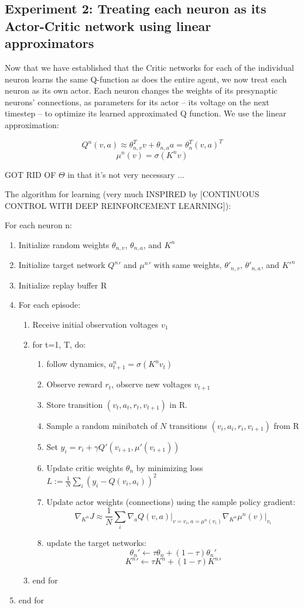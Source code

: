 \subsection{Experiment 2: Treating each neuron as its Actor-Critic network using linear approximators}

Now that we have established that the Critic networks for each of the individual neuron learns the same Q-function as does the entire agent, we now treat each neuron as its own actor. Each neuron changes the weights of its presynaptic neurons' connections, as parameters for its actor -- its voltage on the next timestep -- to optimize its learned approximated Q function. We use the linear approximation:

$$Q^{n}(v, a) \approx \theta_{n,v}^T v + \theta_{n,a}a = \theta_{n}^T (v, a)^T$$
$$\mu^{n}(v) = \sigma(K^n v)$$

GOT RID OF $\Theta$ in that it's not very necessary ...

The algorithm for learning (very much INSPIRED by [CONTINUOUS CONTROL WITH DEEP REINFORCEMENT
LEARNING]):

For each neuron n:
\begin{enumerate}
\item[] Initialize random weights $\theta_{n,v}$, $\theta_{n,a}$, and $K^n$
\item[] Initialize target network $Q^n'$ and $\mu^n'$ with same weights, $\theta'_{n,v}$, $\theta'_{n,a}$, and $K'^n$
\item[] Initialize replay buffer R
\item[] For each episode:
\begin{enumerate}
\item[] Receive initial observation voltages $v_1$
\item[] for t=1, T, do:
\begin{enumerate}
\item[] follow dynamics, $a^n_{t+1} = \sigma(K^n v_t)$
\item[] Observe reward $r_t$, observe new voltages $v_{t+1}$
\item[] Store transition $(v_t, a_t, r_t, v_{t+1})$ in R.
\item[] Sample a random minibatch of $N$ transitions $(v_i, a_i, r_i, v_{i+1})$ from R
\item[] Set $y_i = r_i + \gamma Q'(v_{i+1}, \mu'(v_{i+1}))$
\item[] Update critic weights $\theta_n$ by minimizing loss $L := \frac{1}{N} \sum_i (y_i - Q(v_i, a_i))^2$
\item[] Update actor weights (connections) using the sample policy gradient:
$$\nabla_{K^n} J \approx \frac{1}{N} \sum_i \nabla_a Q(v, a) \vert_{v=v_i, a=\mu^n(v_i)} \nabla_{K^n} \mu^n(v) \vert_{v_i}$$
\item[] update the target networks:
$$\theta_n' \leftarrow \tau \theta_n + (1 - \tau) \theta_n'$$
$$K^n' \leftarrow \tau K^n + (1 - \tau) K^n'$$
\end{enumerate}
\item[] end for
\end{enumerate}
\item[] end for
\end{enumerate}

